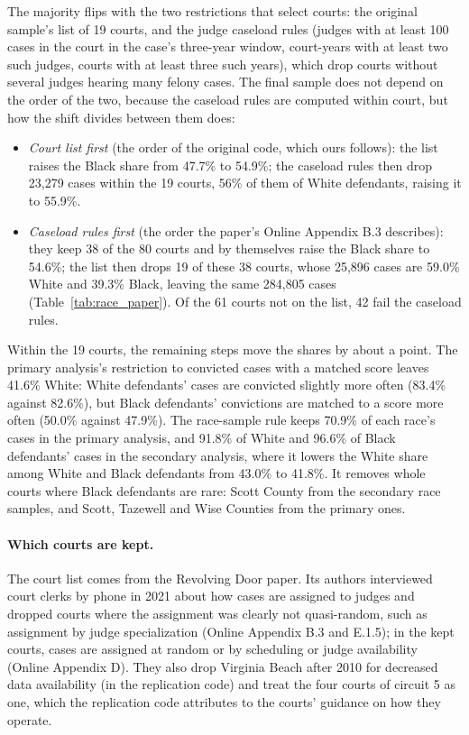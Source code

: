 \documentclass[11pt]{article}
\begin{document}
The majority flips with the two restrictions that select courts: the original sample's list of 19 courts, and the judge caseload rules (judges with at least 100 cases in the court in the case's three-year window, court-years with at least two such judges, courts with at least three such years), which drop courts without several judges hearing many felony cases. The final sample does not depend on the order of the two, because the caseload rules are computed within court, but how the shift divides between them does:
\begin{itemize}
  \item \emph{Court list first} (the order of the original code, which ours follows): the list raises the Black share from 47.7\% to 54.9\%; the caseload rules then drop 23,279 cases within the 19 courts, 56\% of them of White defendants, raising it to 55.9\%.
  \item \emph{Caseload rules first} (the order the paper's Online Appendix B.3 describes): they keep 38 of the 80 courts and by themselves raise the Black share to 54.6\%; the list then drops 19 of these 38 courts, whose 25,896 cases are 59.0\% White and 39.3\% Black, leaving the same 284,805 cases (Table~\ref{tab:race_paper}). Of the 61 courts not on the list, 42 fail the caseload rules.
\end{itemize}

Within the 19 courts, the remaining steps move the shares by about a point. The primary analysis's restriction to convicted cases with a matched score leaves 41.6\% White: White defendants' cases are convicted slightly more often (83.4\% against 82.6\%), but Black defendants' convictions are matched to a score more often (50.0\% against 47.9\%). The race-sample rule keeps 70.9\% of each race's cases in the primary analysis, and 91.8\% of White and 96.6\% of Black defendants' cases in the secondary analysis, where it lowers the White share among White and Black defendants from 43.0\% to 41.8\%. It removes whole courts where Black defendants are rare: Scott County from the secondary race samples, and Scott, Tazewell and Wise Counties from the primary ones.

\paragraph{Which courts are kept.} The court list comes from the Revolving Door paper. Its authors interviewed court clerks by phone in 2021 about how cases are assigned to judges and dropped courts where the assignment was clearly not quasi-random, such as assignment by judge specialization (Online Appendix B.3 and E.1.5); in the kept courts, cases are assigned at random or by scheduling or judge availability (Online Appendix D). They also drop Virginia Beach after 2010 for decreased data availability (in the replication code) and treat the four courts of circuit 5 as one, which the replication code attributes to the courts' guidance on how they operate.
\end{document}
